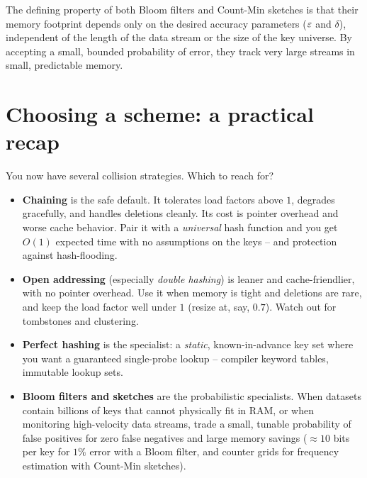 The defining property of both Bloom filters and Count-Min sketches is that their
memory footprint depends only on the desired accuracy parameters ($\varepsilon$ and $\delta$),
independent of the length of the data stream or the size of the key universe. By
accepting a small, bounded probability of error, they track very large streams in small,
predictable memory.

\section{Choosing a scheme: a practical recap}

You now have several collision strategies. Which to reach for?

\begin{itemize}
  \item \textbf{Chaining} is the safe default. It tolerates load factors above $1$, degrades gracefully, and handles deletions cleanly. Its cost is pointer overhead and worse cache behavior. Pair it with a \emph{universal} hash function and you get $O(1)$ expected time with no assumptions on the keys -- and protection against hash-flooding.
  \item \textbf{Open addressing} (especially \emph{double hashing}) is leaner and cache-friendlier, with no pointer overhead. Use it when memory is tight and deletions are rare, and keep the load factor well under $1$ (resize at, say, $0.7$). Watch out for tombstones and clustering.
  \item \textbf{Perfect hashing} is the specialist: a \emph{static}, known-in-advance key set where you want a guaranteed single-probe lookup -- compiler keyword tables, immutable lookup sets.
  \item \textbf{Bloom filters and sketches} are the probabilistic specialists. When datasets contain billions of keys that cannot physically fit in RAM, or when monitoring high-velocity data streams, trade a small, tunable probability of false positives for zero false negatives and large memory savings ($\approx 10$ bits per key for $1\%$ error with a Bloom filter, and counter grids for frequency estimation with Count-Min sketches).
\end{itemize}

